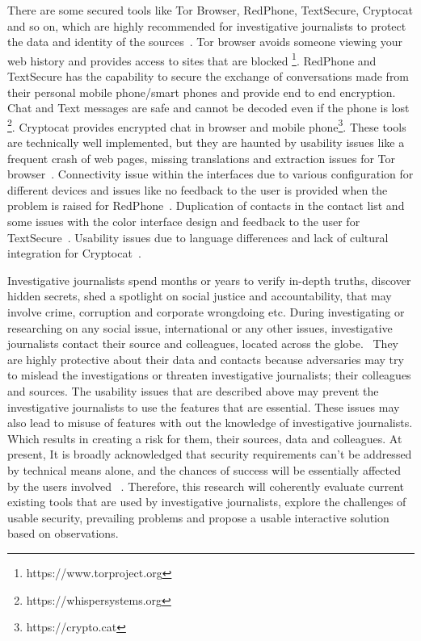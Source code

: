 There are some secured tools like Tor Browser, RedPhone, TextSecure, Cryptocat and so on, which are highly recommended for investigative journalists to protect the data and identity of the sources~\cite{wm4}. Tor browser avoids someone viewing your web history and provides access to sites that are blocked \footnote{https://www.torproject.org}. RedPhone and TextSecure has the capability to secure the exchange of conversations made from their personal mobile phone/smart phones and provide end to end encryption. Chat and Text messages are safe and cannot be decoded even if the phone is lost \footnote{https://whispersystems.org}. Cryptocat provides encrypted chat in browser and mobile phone\footnote{https://crypto.cat}. These tools are technically well implemented, but they are haunted by usability issues like a frequent crash of web pages, missing translations and extraction issues for Tor browser~\cite{pa3}. Connectivity issue within the interfaces due to various configuration for different devices and issues like no feedback to the user is provided when the problem is raised for RedPhone~\cite{sr4}. Duplication of contacts in the contact list and some issues with the color interface design  and feedback to the user for TextSecure~\cite{ti4}. Usability issues due to language differences and lack of cultural integration for Cryptocat~\cite{kobeissi2013cryptocat}.

Investigative journalists spend months or years to verify in-depth truths, discover hidden secrets, shed a spotlight on social justice and accountability, that may involve crime, corruption and corporate wrongdoing etc. During investigating or researching on any social issue, international or any other issues, investigative journalists contact their source and colleagues, located across the globe.~\cite{Ijnet14} They are highly protective about their data and  contacts because adversaries may try to mislead the investigations or threaten investigative journalists; their colleagues and sources. The usability issues that are described above may prevent the investigative journalists to use the features that are essential. These issues may also lead to misuse of features with out the knowledge of investigative journalists. Which results in creating a risk for them, their sources, data and colleagues. At present, It is broadly acknowledged that security requirements can't be addressed by technical means alone, and the chances of success will be essentially affected by the users involved ~\cite{furnell2006challenges}. Therefore, this research will coherently evaluate current existing tools that are used by investigative journalists, explore the challenges of usable security, prevailing problems and propose a usable interactive solution based on observations. 
